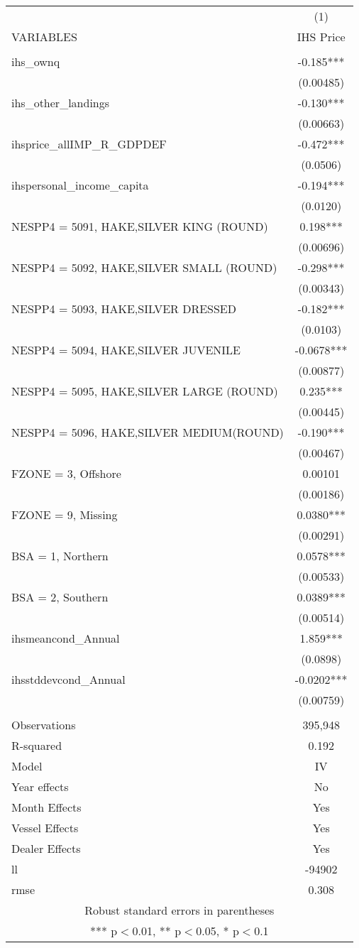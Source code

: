 \begin{tabular}{lc} \hline
 & (1) \\
VARIABLES & IHS Price \\ \hline
 &  \\
ihs\_ownq & -0.185*** \\
 & (0.00485) \\
ihs\_other\_landings & -0.130*** \\
 & (0.00663) \\
ihsprice\_allIMP\_R\_GDPDEF & -0.472*** \\
 & (0.0506) \\
ihspersonal\_income\_capita & -0.194*** \\
 & (0.0120) \\
NESPP4 = 5091, HAKE,SILVER KING (ROUND) & 0.198*** \\
 & (0.00696) \\
NESPP4 = 5092, HAKE,SILVER SMALL (ROUND) & -0.298*** \\
 & (0.00343) \\
NESPP4 = 5093, HAKE,SILVER DRESSED & -0.182*** \\
 & (0.0103) \\
NESPP4 = 5094, HAKE,SILVER JUVENILE & -0.0678*** \\
 & (0.00877) \\
NESPP4 = 5095, HAKE,SILVER LARGE (ROUND) & 0.235*** \\
 & (0.00445) \\
NESPP4 = 5096, HAKE,SILVER MEDIUM(ROUND) & -0.190*** \\
 & (0.00467) \\
FZONE = 3, Offshore & 0.00101 \\
 & (0.00186) \\
FZONE = 9, Missing & 0.0380*** \\
 & (0.00291) \\
BSA = 1, Northern & 0.0578*** \\
 & (0.00533) \\
BSA = 2, Southern & 0.0389*** \\
 & (0.00514) \\
ihsmeancond\_Annual & 1.859*** \\
 & (0.0898) \\
ihsstddevcond\_Annual & -0.0202*** \\
 & (0.00759) \\
 &  \\
Observations & 395,948 \\
R-squared & 0.192 \\
Model & IV \\
Year effects & No \\
Month Effects & Yes \\
Vessel Effects & Yes \\
Dealer Effects & Yes \\
ll & -94902 \\
 rmse & 0.308 \\ \hline
\multicolumn{2}{c}{ Robust standard errors in parentheses} \\
\multicolumn{2}{c}{ *** p$<$0.01, ** p$<$0.05, * p$<$0.1} \\
\end{tabular}
